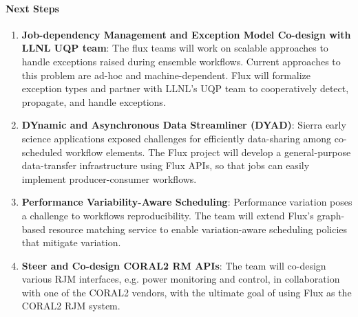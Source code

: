 \paragraph{Next Steps}
\begin{enumerate}

    \item {\bf Job-dependency Management and Exception Model Co-design
    with LLNL UQP team}: The flux teams will work on scalable approaches
    to handle exceptions raised during ensemble workflows. Current
    approaches to this problem are ad-hoc and machine-dependent.  Flux
    will formalize exception types and partner with LLNL's UQP team to
    cooperatively detect, propagate, and handle exceptions.

    \item {\bf DYnamic and Asynchronous Data Streamliner (DYAD)}: Sierra
    early science applications exposed challenges for efficiently
    data-sharing among co-scheduled workflow elements.  The Flux project
    will develop a general-purpose data-transfer infrastructure using Flux
    APIs, so that jobs can easily implement producer-consumer workflows.

    \item {\bf Performance Variability-Aware Scheduling}: Performance
    variation poses a challenge to workflows reproducibility.  The team
    will extend Flux’s graph-based resource matching service to enable
    variation-aware scheduling policies that mitigate variation.

    \item {\bf Steer and Co-design CORAL2 RM APIs}: The team will
    co-design various RJM interfaces, e.g. power monitoring and control,
    in collaboration with one of the CORAL2 vendors, with the ultimate
    goal of using Flux as the CORAL2 RJM system.

\end{enumerate}
